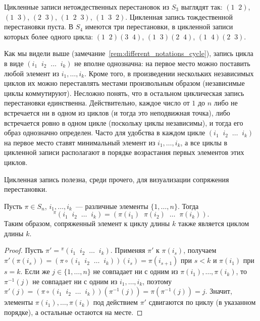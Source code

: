 \begin{example}
Цикленные записи нетождественных перестановок из $S_3$ выглядят так:
$(1\;\;2)$, $(1\;\;3)$, $(2\;\;3)$, $(1\;\;2\;\;3)$,
$(1\;\;3\;\;2)$. Цикленная запись тождественной перестановки пуста.
В $S_4$ имеются три перестановки, в цикленной записи которых более
одного цикла: $(1\;\;2)(3\;\;4)$, $(1\;\;3)(2\;\;4)$,
$(1\;\;4)(2\;\;3)$.
\end{example}

\begin{remark}
Как мы видели выше (замечание~\ref{rem:different_notations_cycle}),
запись цикла в виде $(i_1\;\;i_2\;\;\dots\;\;i_k)$ не вполне
однозначна: на первое место можно поставить любой элемент из
$i_1,\dots,i_k$. Кроме того, в произведении нескольких независимых
циклов их можно переставлять местами произвольным образом (независимые
циклы коммутируют). Несложно понять, что в остальном циклическая
запись перестановки единственна. Действительно, каждое число от $1$ до
$n$ либо не встречается ни в одном из циклов (и тогда это неподвижная
точка), либо встречается ровно в одном цикле (поскольку циклы
независимы), и тогда его образ однозначно определен. Часто для
удобства в каждом цикле
$(i_1\;\;i_2\;\;\dots\;\;i_k)$ на первое место ставят минимальный
элемент из $i_1,\dots,i_k$, а все циклы в цикленной записи располагают
в порядке возрастания первых элементов этих циклов. 
\end{remark}

Цикленная запись полезна, среди прочего, для визуализации сопряжения
перестановки.

\begin{lemma}\label{lem:cycle_conjugation}
Пусть $\pi\in S_n$, $i_1,\dots,i_k$~--- различные элементы
$\{1,\dots,n\}$. Тогда
$$
{}^\pi(i_1\;\;i_2\;\;\dots\;\;i_k) =
(\pi(i_1)\;\;\pi(i_2)\;\;\dots\;\;\pi(i_k)).
$$
Таким образом, сопряженный элемент к циклу длины $k$ также является
циклом длины $k$.
\end{lemma}
\begin{proof}
Пусть $\pi'= {}^\pi(i_1\;\;i_2\;\;\dots\;\;i_k)$. Применяя
$\pi'$ к $\pi(i_s)$, получаем
$\pi'(\pi(i_s)) = (\pi\circ(i_1\;\;i_2\;\;\dots\;\;i_k))(i_s)
= \pi(i_{s+1})$ при $s<k$ и $\pi(i_1)$ при $s=k$.
Если же $j\in\{1,\dots,n\}$ не совпадает ни с одним из
$\pi(i_1),\dots,\pi(i_k)$, то $\pi^{-1}(j)$ не совпадает ни с одним из
$i_1,\dots,i_k$, поэтому
$\pi'(j) = (\pi\circ(i_1\;\;i_2\;\;\dots\;\;i_k))(\pi^{-1}(j))
= \pi(\pi^{-1}(j)) = j$.
Значит, элементы $\pi(i_1),\dots,\pi(i_k)$ под действием
$\pi'$ сдвигаются по циклу (в указанном порядке), а остальные остаются
на месте.
\end{proof}

